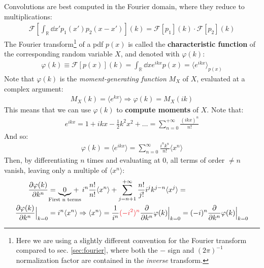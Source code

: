 \documentclass[../template.tex]{subfiles}
\begin{document}
\medskip

Convolutions are best computed in the Fourier domain, where they reduce to multiplications:
\begin{align} \label{eqn:conv-property}
    \mathcal{F}\left[\int_{\mathbb{R}} \dd{x'} p_1(x') p_2(x-x')\right](k) = \mathcal{F}[p_1](k) \cdot \mathcal{F}[p_2](k)
\end{align}
The Fourier transform\footnote{Here we are using a slightly different convention for the Fourier transform compared to sec. \ref{sec:fourier}, where both the $-$ sign and $(2\pi)^{-1}$ normalization factor are contained in the \textit{inverse} transform.} of a pdf $p(x)$ is called the \textbf{characteristic function} of the corresponding random variable $X$, and denoted with $\varphi(k)$:
\begin{align*}
    \varphi(k) \equiv \mathcal{F}[p(x)](k) = \int_{\mathbb{R}} \dd{x} e^{ikx} p(x) = \langle e^{ikx} \rangle_{p(x)}
\end{align*} 
Note that $\varphi(k)$ is the \textit{moment-generating function} $M_X$ of $X$, evaluated at a complex argument:
\begin{align*}
    M_X(k) = \langle e^{kx} \rangle \Rightarrow \varphi(k) = M_X(ik)
\end{align*} 
This means that we can use $\varphi(k)$ to \textbf{compute moments} of $X$. Note that:
\begin{align*}
    e^{ikx} = 1 + ikx -\frac{1}{2}k^2 x^2 + \dots = \sum_{n=0}^{+\infty} \frac{(ikx)^n}{n!}  
\end{align*}
And so:
\begin{align} \label{eqn:characteristic-expansion}
    \varphi(k) = \langle e^{ikx} \rangle = \sum_{n=0}^{\infty} \frac{i^n k^n}{n!} \langle x^n \rangle 
\end{align}
Then, by differentiating $n$ times and evaluating at $0$, all terms of order $\neq n$ vanish, leaving only a multiple of $\langle x^n \rangle$:
\begin{align*}
    \pdv{\varphi(k)}{k^n} &= \quad \mathclap{\underbrace{0}_{\text{{First n terms}}}} \quad + \> i^n \frac{n!}{n!} \langle x^n \rangle +\sum_{j=n+1}^{+\infty} \frac{n!}{j!} i^j k^{j-n} \langle x^j \rangle  =\\
    \pdv{\varphi(k)}{k^n} \Big|_{k=0} &= i^n \langle x^n \rangle \Rightarrow \langle x^n \rangle = \frac{1}{i^n} \textcolor{Red}{(-i^2)^n} \pdv{k^n}\varphi(k) \Big|_{k=0} = (-i)^n \pdv{k^n} \varphi(k) \Big|_{k=0} 
\end{align*}
\end{document}
